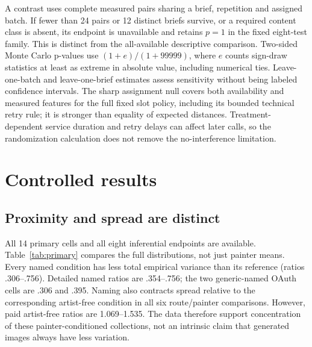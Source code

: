 \documentclass[11pt]{article}
\begin{document}
A contrast uses complete measured pairs sharing a brief, repetition and assigned
batch. If fewer than 24 pairs or 12 distinct briefs survive, or a required
content class is absent, its endpoint is unavailable and retains $p=1$ in the
fixed eight-test family. This is distinct from the all-available descriptive
comparison. Two-sided Monte Carlo p-values use $(1+e)/(1+99999)$, where $e$ counts
sign-draw statistics at least as extreme in absolute value, including numerical
ties. Leave-one-batch and leave-one-brief estimates assess sensitivity without
being labeled confidence intervals. The sharp assignment null covers both
availability and measured features for the full fixed slot policy, including its
bounded technical retry rule; it is stronger than equality of expected distances.
Treatment-dependent service duration and retry delays can affect later calls,
so the randomization calculation does not remove the no-interference limitation.

\section{Controlled results}
\subsection{Proximity and spread are distinct}
All 14 primary cells and all eight inferential endpoints are available.
Table~\ref{tab:primary} compares the full distributions, not just painter means.
Every named condition has less total empirical variance than its reference
(ratios .306--.756). Detailed named ratios are .354--.756; the two generic-named
OAuth cells are .306 and .395. Naming also contracts spread relative to the
corresponding artist-free condition in all six route/painter comparisons.
However, paid artist-free ratios are 1.069--1.535. The data therefore support
concentration of these painter-conditioned collections, not an intrinsic claim
that generated images always have less variation.
\end{document}
